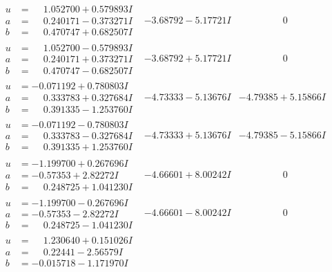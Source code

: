 \documentclass[1p]{elsarticle_modified}
\theoremstyle{definition}
\begin{document}
$$\begin{array}{c|c|c}
\begin{aligned}
u &= \phantom{-}1.052700 + 0.579893 I \\
a &= \phantom{-}0.240171 - 0.373271 I \\
b &= \phantom{-}0.470747 + 0.682507 I\end{aligned}
 & -3.68792 - 5.17721 I & \phantom{-0.000000 } 0 \\ \hline\begin{aligned}
u &= \phantom{-}1.052700 - 0.579893 I \\
a &= \phantom{-}0.240171 + 0.373271 I \\
b &= \phantom{-}0.470747 - 0.682507 I\end{aligned}
 & -3.68792 + 5.17721 I & \phantom{-0.000000 } 0 \\ \hline\begin{aligned}
u &= -0.071192 + 0.780803 I \\
a &= \phantom{-}0.333783 + 0.327684 I \\
b &= \phantom{-}0.391335 - 1.253760 I\end{aligned}
 & -4.73333 - 5.13676 I & -4.79385 + 5.15866 I \\ \hline\begin{aligned}
u &= -0.071192 - 0.780803 I \\
a &= \phantom{-}0.333783 - 0.327684 I \\
b &= \phantom{-}0.391335 + 1.253760 I\end{aligned}
 & -4.73333 + 5.13676 I & -4.79385 - 5.15866 I \\ \hline\begin{aligned}
u &= -1.199700 + 0.267696 I \\
a &= -0.57353 + 2.82272 I \\
b &= \phantom{-}0.248725 + 1.041230 I\end{aligned}
 & -4.66601 + 8.00242 I & \phantom{-0.000000 } 0 \\ \hline\begin{aligned}
u &= -1.199700 - 0.267696 I \\
a &= -0.57353 - 2.82272 I \\
b &= \phantom{-}0.248725 - 1.041230 I\end{aligned}
 & -4.66601 - 8.00242 I & \phantom{-0.000000 } 0 \\ \hline\begin{aligned}
u &= \phantom{-}1.230640 + 0.151026 I \\
a &= \phantom{-}0.22441 - 2.56579 I \\
b &= -0.015718 - 1.171970 I\end{aligned}

\end{array}$$
\end{document}
